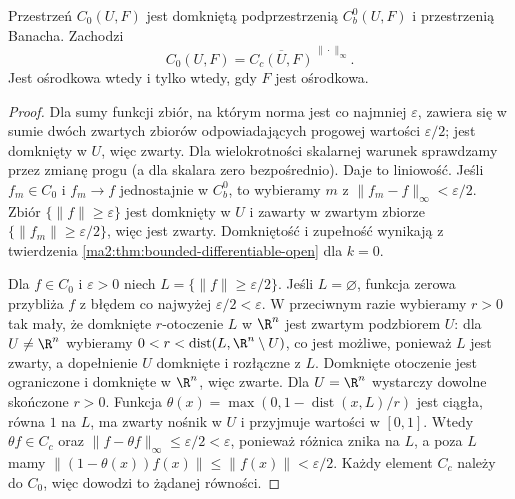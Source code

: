 \begin{twierdzenie}
\label{ma2:thm:c0-banach-separable}
Przestrzeń $C_0(U,F)$ jest domkniętą
podprzestrzenią $C_b^0(U,F)$ i przestrzenią
Banacha. Zachodzi
\[
 C_0(U,F)=\overline{C_c(U,F)}^{\,\|\cdot\|_\infty}.
\]
Jest ośrodkowa wtedy i tylko wtedy,
gdy $F$ jest ośrodkowa.
\end{twierdzenie}
\begin{proof}
Dla sumy funkcji zbiór, na którym norma
jest co najmniej $\varepsilon$, zawiera się
w sumie dwóch zwartych zbiorów odpowiadających
progowej wartości $\varepsilon/2$; jest
domknięty w $U$, więc zwarty. Dla wielokrotności
skalarnej warunek sprawdzamy przez zmianę
progu (a dla skalara zero bezpośrednio).
Daje to liniowość.
Jeśli $f_m\in C_0$ i $f_m\to f$ jednostajnie
w $C_b^0$, to wybieramy $m$ z
$\|f_m-f\|_\infty<\varepsilon/2$.
Zbiór $\{\|f\|\ge\varepsilon\}$ jest domknięty
w $U$ i zawarty w zwartym zbiorze
$\{\|f_m\|\ge\varepsilon/2\}$, więc jest
zwarty. Domkniętość i zupełność wynikają
z twierdzenia \ref{ma2:thm:bounded-differentiable-open}
dla $k=0$.

Dla $f\in C_0$ i $\varepsilon>0$ niech
$L=\{\|f\|\ge\varepsilon/2\}$.
Jeśli $L=\varnothing$, funkcja zerowa
przybliża $f$ z błędem co najwyżej
$\varepsilon/2<\varepsilon$. W przeciwnym razie
wybieramy $r>0$ tak mały, że domknięte
$r$-otoczenie $L$ w $\R^n$ jest zwartym
podzbiorem $U$: dla $U\ne\R^n$ wybieramy
$0<r<\operatorname{dist}(L,\R^n\setminus U)$,
co jest możliwe, ponieważ $L$ jest zwarty,
a dopełnienie $U$ domknięte i rozłączne z $L$.
Domknięte otoczenie jest ograniczone
i domknięte w $\R^n$, więc zwarte.
Dla $U=\R^n$ wystarczy dowolne skończone $r>0$.
Funkcja
$\theta(x)=\max(0,1-\operatorname{dist}(x,L)/r)$
jest ciągła, równa $1$ na $L$, ma zwarty
nośnik w $U$ i przyjmuje wartości w $[0,1]$.
Wtedy $\theta f\in C_c$ oraz
$\|f-\theta f\|_\infty\le\varepsilon/2<\varepsilon$,
ponieważ różnica znika na $L$, a poza $L$
mamy $\|(1-\theta(x))f(x)\|\le\|f(x)\|<\varepsilon/2$.
Każdy element $C_c$ należy do $C_0$,
więc dowodzi to żądanej równości.


\end{proof}
